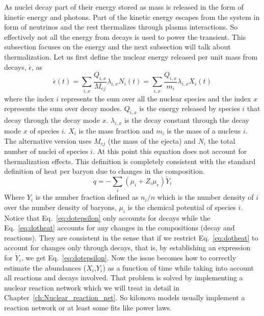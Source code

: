 As nuclei decay part of their energy stored as mass is released in the form of kinetic energy and photons.
Part of the kinetic energy escapes from the system in form of neutrinos and the rest thermalizes through plasma interactions.
So effectively not all the energy from decays is used to power the transient.
This subsection focuses on the energy and the next subsection will talk about thermalization.
Let us first define the nuclear energy released per unit mass from decays, $\dot\epsilon$,  as 
\begin{equation}\label{eq:dotepsilon}
  \dot \epsilon(t)=\sum_{i,x} \frac{Q_{i,x}}{M_{ej}}\lambda_{i,x}N_i(t)= \sum_{i,x} \frac{Q_{i,x}}{m_i}\lambda_{i,x}X_i(t)
\end{equation}
where the index $i$ represents the sum over all the nuclear species and the index $x$ represents the sum over decay modes. 
$Q_{i,x}$ is the energy released by species $i$ that decay through the decay mode $x$.
$\lambda_{i,x}$ is the decay constant through the decay mode $x$ of species $i$.
$X_i$ is the mass fraction and $m_i$ is the mass of a nucleus $i$.
The alternative version uses $M_{ej}$ (the mass of the ejecta) and $N_i$ the total number of nuclei of species $i$.
At this point this equation does not account for thermalization effects.
This definition is completely consistent with the standard definition of heat per baryon due to changes in the composition.
\begin{equation}\label{eq:dotheat}
  \dot q =-\sum_i (\mu_i+Z_i\mu_e)\dot Y_i
\end{equation} 
Where $Y_i$ is the number fraction defined as $n_i/n$ which is the number density of $i$ over the number density of baryons, $\mu_i$ is the chemical potential of species $i$. 
Notice that Eq.~\ref{eq:dotepsilon} only accounts for decays while the Eq.~\ref{eq:dotheat} accounts for any changes in the compositions (decay and reactions).
They are consistent in the sense that if we restrict Eq.~\ref{eq:dotheat} to account for changes only through decays, that is, by establishing an expression for $\dot Y_i$, we get Eq.~\ref{eq:dotepsilon}.
Now the issue becomes how to correctly estimate the abundances ($X_i$,$Y_i$) as a function of time while taking into account all reactions and decays involved. 
That problem is solved by implementing a nuclear reaction network which we will treat in detail in Chapter~\ref{ch:Nuclear_reaction_net}.
So kilonova models usually implement a reaction network or at least some fits like power laws.
 
